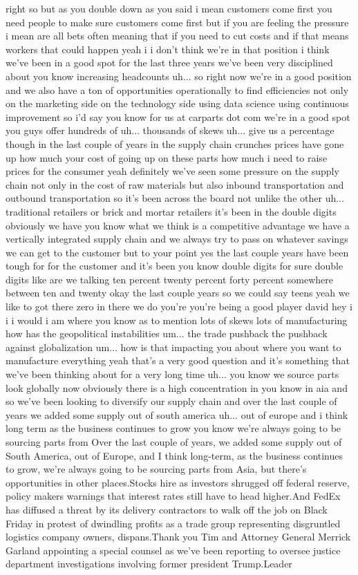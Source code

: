 \documentclass{article}%
\begin{document}
right so but as you double down as you said i mean customers come first you need people to make sure customers come first but if you are feeling the pressure i mean are all bets often meaning that if you need to cut costs and if that means workers that could happen yeah i i don't think we're in that position i think we've been in a good spot for the last three years we've been very disciplined about you know increasing headcounts uh... so right now we're in a good position and we also have a ton of opportunities operationally to find efficiencies not only on the marketing side on the technology side using data science using continuous improvement so i'd say you know for us at carparts dot com we're in a good spot you guys offer hundreds of uh... thousands of skews uh... give us a percentage though in the last couple of years in the supply chain crunches prices have gone up how much your cost of going up on these parts how much i need to raise prices for the consumer yeah definitely we've seen some pressure on the supply chain not only in the cost of raw materials but also inbound transportation and outbound transportation so it's been across the board not unlike the other uh... traditional retailers or brick and mortar retailers it's been in the double digits obviously we have you know what we think is a competitive advantage we have a vertically integrated supply chain and we always try to pass on whatever savings we can get to the customer but to your point yes the last couple years have been tough for for the customer and it's been you know double digits for sure double digits like are we talking ten percent twenty percent forty percent somewhere between ten and twenty okay the last couple years so we could say teens yeah we like to got there zero in there we do you're you're being a good player david hey i i i would i am where you know as to mention lots of skews lots of manufacturing how has the geopolitical instabilities um... the trade pushback the pushback against globalization um... how is that impacting you about where you want to manufacture everything yeah that's a very good question and it's something that we've been thinking about for a very long time uh... you know we source parts look globally now obviously there is a high concentration in you know in aia and so we've been looking to diversify our supply chain and over the last couple of years we added some supply out of south america uh... out of europe and i think long term as the business continues to grow you know we're always going to be sourcing parts from  Over the last couple of years, we added some supply out of South America, out of Europe, and I think long{-}term, as the business continues to grow, we're always going to be sourcing parts from Asia, but there's opportunities in other places.Stocks hire as investors shrugged off federal reserve, policy makers warnings that interest rates still have to head higher.And FedEx has diffused a threat by its delivery contractors to walk off the job on Black Friday in protest of dwindling profits as a trade group representing disgruntled logistics company owners, dispans.Thank you Tim and Attorney General Merrick Garland appointing a special counsel as we've been reporting to oversee justice department investigations involving former president Trump.Leader 
\end{document}
